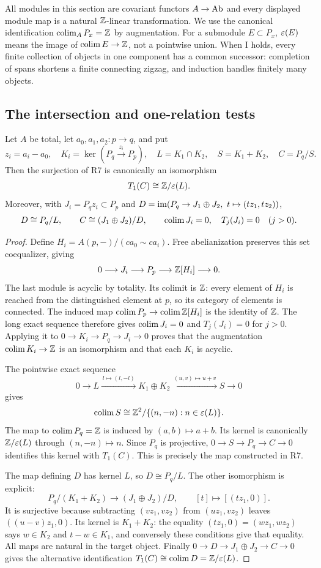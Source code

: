 All modules in this section are covariant functors $A\to\mathrm{Ab}$ and every displayed module map is a natural $\mathbb Z$-linear transformation. We use the canonical identification $\operatorname*{colim}_A P_x=\mathbb Z$ by augmentation. For a submodule $E\subset P_x$, $\varepsilon(E)$ means the image of $\operatorname*{colim} E\to\mathbb Z$, not a pointwise union. When I holds, every finite collection of objects in one component has a common successor: completion of spans shortens a finite connecting zigzag, and induction handles finitely many objects.

\subsection{The intersection and one-relation tests}

\begin{theorem}\label{B:lead1}
Let $A$ be total, let $a_0,a_1,a_2:p\to q$, and put
\[
 z_i=a_i-a_0,\quad K_i=\ker(P_q\xrightarrow{\,z_i\,}P_p),\quad
 L=K_1\cap K_2,\quad S=K_1+K_2,\quad C=P_q/S.
\]
Then the surjection of R7 is canonically an isomorphism
\[
 T_1(C)\cong\mathbb Z/\varepsilon(L).
\]
Moreover, with $J_i=P_qz_i\subset P_p$ and
$D=\im(P_q\to J_1\oplus J_2,\ t\mapsto(tz_1,tz_2))$,
\[
 D\cong P_q/L,\qquad C\cong(J_1\oplus J_2)/D,
 \qquad \operatorname*{colim} J_i=0,\quad T_j(J_i)=0\quad(j>0).
\]
\end{theorem}
\begin{proof}
Define $H_i=A(p,-)/(ca_0\sim ca_i)$. Free abelianization preserves this set coequalizer, giving
\[
 0\longrightarrow J_i\longrightarrow P_p\longrightarrow\mathbb Z[H_i]
 \longrightarrow0.
\]
The last module is acyclic by totality. Its colimit is $\mathbb Z$: every element of $H_i$ is reached from the distinguished element at $p$, so its category of elements is connected. The induced map $\operatorname*{colim} P_p\to\operatorname*{colim}\mathbb Z[H_i]$ is the identity of $\mathbb Z$. The long exact sequence therefore gives $\operatorname*{colim} J_i=0$ and $T_j(J_i)=0$ for $j>0$. Applying it to
$0\to K_i\to P_q\to J_i\to0$ proves that the augmentation
$\operatorname*{colim} K_i\to\mathbb Z$ is an isomorphism and that each $K_i$ is acyclic.

The pointwise exact sequence
\[
 0\longrightarrow L\xrightarrow{\,l\mapsto(l,-l)\,}
 K_1\oplus K_2\xrightarrow{\,(u,v)\mapsto u+v\,}S
 \longrightarrow0
\]
gives
\[
 \operatorname*{colim} S\cong\mathbb Z^2/\{(n,-n):n\in\varepsilon(L)\}.
\]
The map to $\operatorname*{colim} P_q=\mathbb Z$ is induced by $(a,b)\mapsto a+b$. Its kernel is canonically $\mathbb Z/\varepsilon(L)$ through $(n,-n)\mapsto n$. Since $P_q$ is projective, $0\to S\to P_q\to C\to0$ identifies this kernel with $T_1(C)$. This is precisely the map constructed in R7.

The map defining $D$ has kernel $L$, so $D\cong P_q/L$. The other isomorphism is explicit:
\[
 P_q/(K_1+K_2)\longrightarrow(J_1\oplus J_2)/D,
 \qquad [t]\longmapsto[(tz_1,0)].
\]
It is surjective because subtracting $(vz_1,vz_2)$ from $(uz_1,vz_2)$ leaves $((u-v)z_1,0)$. Its kernel is $K_1+K_2$: the equality $(tz_1,0)=(wz_1,wz_2)$ says $w\in K_2$ and $t-w\in K_1$, and conversely these conditions give that equality. All maps are natural in the target object. Finally $0\to D\to J_1\oplus J_2\to C\to0$ gives the alternative identification $T_1(C)\cong\operatorname*{colim} D=\mathbb Z/\varepsilon(L)$.
\end{proof}

